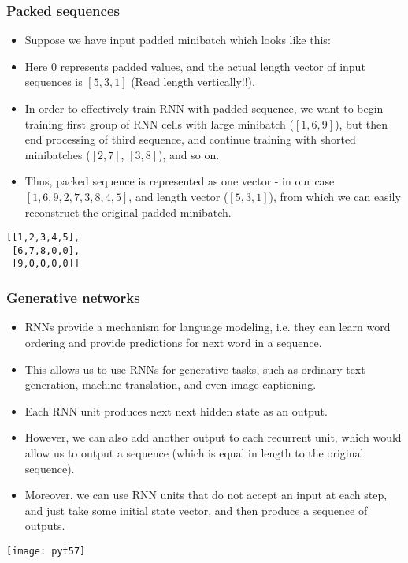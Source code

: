 \begin{frame}[fragile] \frametitle{Packed sequences}

\begin{itemize}
\item Suppose we have input padded minibatch which looks like this:

\item Here 0 represents padded values, and the actual length vector of input sequences is $[5,3,1]$ (Read length vertically!!).

\item In order to effectively train RNN with padded sequence, we want to begin training first group of RNN cells with large minibatch ($[1,6,9]$), but then end processing of third sequence, and continue training with shorted minibatches ($[2,7]$, $[3,8]$), and so on. 
\item Thus, packed sequence is represented as one vector - in our case $[1,6,9,2,7,3,8,4,5]$, and length vector ($[5,3,1]$), from which we can easily reconstruct the original padded minibatch.
\end{itemize}

\begin{lstlisting}
[[1,2,3,4,5],
 [6,7,8,0,0],
 [9,0,0,0,0]]
\end{lstlisting}


\end{frame}

\begin{frame}[fragile] \frametitle{Generative networks}

\begin{itemize}
\item RNNs provide a mechanism for language modeling, i.e. they can learn word ordering and provide predictions for next word in a sequence.
\item This allows us to use RNNs for generative tasks, such as ordinary text generation, machine translation, and even image captioning.
\item Each RNN unit produces next next hidden state as an output. 
\item However, we can also add another output to each recurrent unit, which would allow us to output a sequence (which is equal in length to the original sequence). \item Moreover, we can use RNN units that do not accept an input at each step, and just take some initial state vector, and then produce a sequence of outputs.
\end{itemize}

\begin{center}
\texttt{[image: pyt57]}
\end{center}

\end{frame}


